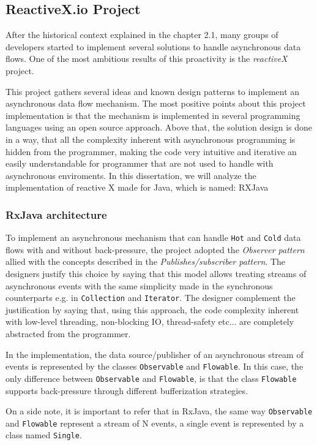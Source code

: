 \subsection{ReactiveX.io Project}
\label{reactivex}

After the historical context explained in the chapter 2.1, many groups of developers started to implement several solutions to handle asynchronous data flows. One of the most ambitious results of this proactivity is the \textit{reactiveX} project.

This project gathers several ideas and known design patterns to implement an asynchronous data flow mechanism. 
The most positive points about this project implementation is that the mechanism is implemented in several programming languages using an open source approach. Above that, the solution design is done in a way, that all the complexity inherent with asynchronous programming is hidden from the programmer, making the code very intuitive and iterative an easily understandable for programmer that are not used to handle with asynchronous enviroments. 
In this dissertation, we will analyze the implementation of reactive X made for Java, which is named: RXJava
\clearpage
\subsubsection{RxJava architecture}
\label{rxjava}
To implement an asynchronous mechanism that can handle \texttt{Hot} and \texttt{Cold} data flows with and without back-pressure, the project adopted the \textit{Observer pattern} allied with the concepts described in the \textit{Publishes/subscriber pattern}.
The designers justify this choice by saying that this model allows treating streams of asynchronous events with the same simplicity made in the synchronous counterparts e.g. in \texttt{Collection} and \texttt{Iterator}. The designer complement the justification by saying that, using this approach, the code complexity inherent with low-level threading, non-blocking IO, thread-safety etc... are completely abstracted from the programmer.

In the implementation, the data source/publisher of an asynchronous stream of events is represented by the classes \texttt{Observable} and \texttt{Flowable}. In this case, the only difference between \texttt{Observable} and \texttt{Flowable}, is that the class \texttt{Flowable} supports back-pressure through different bufferization strategies.

On a side note, it is important to refer that in RxJava, the same way \texttt{Observable} and \texttt{Flowable} represent a stream of N events, a single event is represented by a class named \texttt{Single}. 

